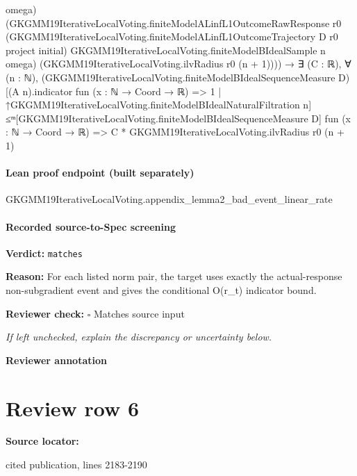 \documentclass[10pt]{article}
\newcommand{\reviewerbox}{%
  \par\noindent\fbox{\parbox{0.96\linewidth}{\rule{0pt}{0.38in}}}\par
}
\newcommand{\reviewmatch}[1]{%
  \par\noindent\textbf{Reviewer check:} $\square$\; #1\par
  \noindent\emph{If left unchecked, explain the discrepancy or uncertainty below.}\par
}
\begin{document}
\begin{ReviewVerbatim}
                              omega)
                            (GKGMM19IterativeLocalVoting.finiteModelALinfL1OutcomeRawResponse r0
                              (GKGMM19IterativeLocalVoting.finiteModelALinfL1OutcomeTrajectory D r0 project initial)
                              GKGMM19IterativeLocalVoting.finiteModelBIdealSample n omega)
                            (GKGMM19IterativeLocalVoting.ilvRadius r0 (n + 1)))) →
                  ∃ (C : ℝ),
                    ∀ (n : ℕ),
                      (GKGMM19IterativeLocalVoting.finiteModelBIdealSequenceMeasure
                            D)[(A n).indicator fun (x : ℕ → Coord → ℝ) => 1 |
                          ↑GKGMM19IterativeLocalVoting.finiteModelBIdealNaturalFiltration
                            n] ≤ᵐ[GKGMM19IterativeLocalVoting.finiteModelBIdealSequenceMeasure D]
                        fun (x : ℕ → Coord → ℝ) => C * GKGMM19IterativeLocalVoting.ilvRadius r0 (n + 1)
\end{ReviewVerbatim}

\paragraph{Lean proof endpoint (built separately)}\begin{ReviewVerbatim}
GKGMM19IterativeLocalVoting.appendix_lemma2_bad_event_linear_rate
\end{ReviewVerbatim}

\paragraph{Recorded source-to-Spec screening}
\textbf{Verdict:} \texttt{matches}
\\
{\raggedright
\textbf{Reason:} For each listed norm pair, the target uses exactly the actual-\allowbreak{}response non-\allowbreak{}subgradient event and gives the conditional O(r\_\allowbreak{}t) indicator bound.\allowbreak{}
\par}
\reviewmatch{Matches source input}
\noindent\textbf{Reviewer annotation}\par
\reviewerbox
\clearpage
\hypertarget{source-claim-4069888dfd6281a0}{}
\section*{Review row 6}
\textbf{Source locator:} {\footnotesize\raggedright cited publication, lines 2183-\allowbreak{}2190\par}
\end{document}
